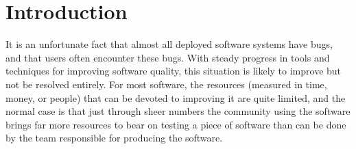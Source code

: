 \section{Introduction}

It is an unfortunate fact that almost all deployed software systems
have bugs, and that users often encounter these bugs.  With steady
progress in tools and techniques for improving software quality, this
situation is likely to improve but not be resolved entirely.  For most
software, the resources (measured in time, money, or people) that can
be devoted to improving it are quite limited, and the normal case is
that just through sheer numbers the community using the software
brings far more resources to bear on testing a piece of software than
can be done by the team responsible for producing the software.

